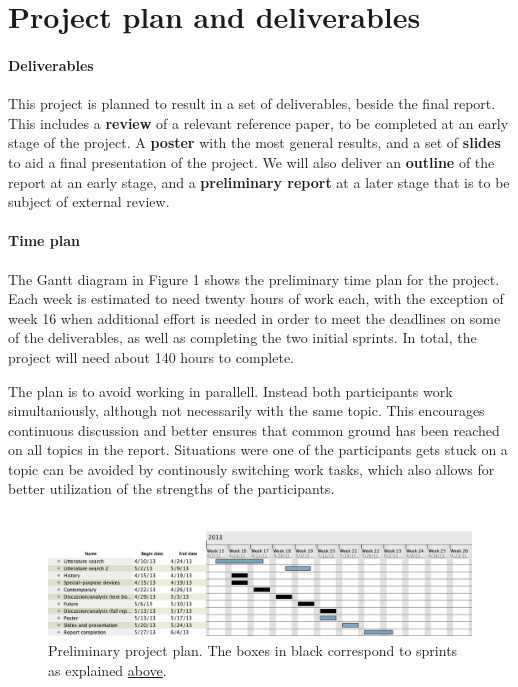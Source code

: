\documentclass[a4paper,10pt]{article}
\begin{document}
\section{Project plan and deliverables}
\paragraph{Deliverables}
This project is planned to result in a set of deliverables, beside the final report. This includes a \textbf{review} of a relevant reference paper, to be completed at an early stage of the project. A \textbf{poster} with the most general results, and a set of \textbf{slides} to aid a final presentation of the project. We will also deliver an \textbf{outline} of the report at an early stage, and a \textbf{preliminary report} at a later stage that is to be subject of external review.


\paragraph{Time plan}

The Gantt diagram in Figure 1 shows the preliminary time plan for the project. Each week is estimated to need twenty hours of work each, with the exception of week 16 when additional effort is needed in order to meet the deadlines on some of the deliverables, as well as completing the two initial sprints. In total, the project will need about 140 hours to complete.

The plan is to avoid working in parallell. Instead both participants work simultaniously, although not necessarily with the same topic. This encourages continuous discussion and better ensures that common ground has been reached on all topics in the report. Situations were one of the participants gets stuck on a topic can be avoided by continously switching work tasks, which also allows for better utilization of the strengths of the participants.

\begin{figure}[h!]
\includegraphics[width=\textwidth]{ganttuppsats.png}
\caption{Preliminary project plan. The boxes in black correspond to sprints as explained \hyperref[sec:method]{above}.}
\label{fig:timePlan}
\end{figure}
\end{document}
